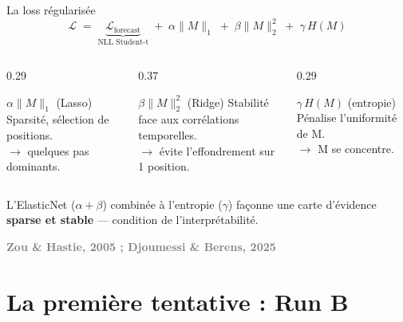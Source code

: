 \documentclass[10pt]{beamer}
\newcommand{\source}[1]{\vspace{4pt}\hfill{\textcolor{gray}{\textbf{\tiny #1}}}}
\begin{document}
\begin{frame}{La loss régularisée}
  \begin{equation*}
    \mathcal{L} \;=\; \underbrace{\mathcal{L}_{\text{forecast}}}_{\text{NLL Student-t}} \;+\; \alpha\|M\|_1 \;+\; \beta\|M\|_2^2 \;+\; \gamma\,H(M)
  \end{equation*}

  \begin{columns}
    \begin{column}{0.29\textwidth}
      \begin{block}{$\alpha\|M\|_1$ (Lasso)}
        \footnotesize
        Sparsité, sélection de positions.\\
        $\rightarrow$ quelques pas dominants.
      \end{block}
    \end{column}
    \begin{column}{0.37\textwidth}
      \begin{block}{$\beta\|M\|_2^2$ (Ridge)}
        \footnotesize
        Stabilité face aux corrélations temporelles.\\
        $\rightarrow$ évite l'effondrement sur 1 position.
      \end{block}
    \end{column}
    \begin{column}{0.29\textwidth}
      \begin{block}{$\gamma\,H(M)$ (entropie)}
        \footnotesize
        Pénalise l'uniformité de M.\\
        $\rightarrow$ M se concentre.
      \end{block}
    \end{column}
  \end{columns}

  \vspace{6pt}
  \begin{interpbox}
    L'ElasticNet ($\alpha + \beta$) combinée à l'entropie ($\gamma$) façonne une carte d'évidence \textbf{sparse et stable} --- condition de l'interprétabilité.
  \end{interpbox}

  \source{Zou \& Hastie, 2005 ; Djoumessi \& Berens, 2025}
\end{frame}


\section{La première tentative : Run B}
\end{document}
